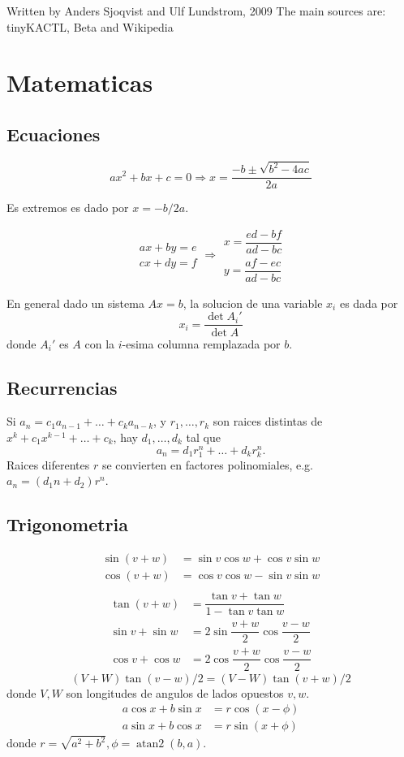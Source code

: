 Written by Anders Sjoqvist and Ulf Lundstrom, 2009
The main sources are: tinyKACTL, Beta and Wikipedia

\chapter{Matematicas}

\section{Ecuaciones}
\[ax^2+bx+c=0 \Rightarrow x = \frac{-b\pm\sqrt{b^2-4ac}}{2a}\]

Es extremos es dado por $x = -b/2a$.

\[\begin{aligned}ax+by=e\\cx+dy=f\end{aligned}
\Rightarrow
\begin{aligned}x=\dfrac{ed-bf}{ad-bc}\\y=\dfrac{af-ec}{ad-bc}\end{aligned}\]

En general dado un sistema $Ax = b$, la solucion de una variable $x_i$ es dada por
\[x_i = \frac{\det A_i'}{\det A} \]
donde $A_i'$ es $A$ con la $i$-esima columna remplazada por $b$.

\section{Recurrencias}
Si $a_n = c_1 a_{n-1} + \dots + c_k a_{n-k}$, y $r_1, \dots, r_k$ son raices distintas de $x^k + c_1 x^{k-1} + \dots + c_k$, hay $d_1, \dots, d_k$ tal que
\[a_n = d_1r_1^n + \dots + d_kr_k^n. \]
Raices diferentes $r$ se convierten en factores polinomiales, e.g. $a_n = (d_1n + d_2)r^n$.

\section{Trigonometria}
\begin{align*}
\sin(v+w)&{}=\sin v\cos w+\cos v\sin w\\
\cos(v+w)&{}=\cos v\cos w-\sin v\sin w\\
\end{align*}
\begin{align*}
\tan(v+w)&{}=\dfrac{\tan v+\tan w}{1-\tan v\tan w}\\
\sin v+\sin w&{}=2\sin\dfrac{v+w}{2}\cos\dfrac{v-w}{2}\\
\cos v+\cos w&{}=2\cos\dfrac{v+w}{2}\cos\dfrac{v-w}{2}
\end{align*}
\[ (V+W)\tan(v-w)/2{}=(V-W)\tan(v+w)/2 \]
donde $V, W$ son longitudes de angulos de lados opuestos $v, w$.
\begin{align*}
	a\cos x+b\sin x&=r\cos(x-\phi)\\
	a\sin x+b\cos x&=r\sin(x+\phi)
\end{align*}
donde $r=\sqrt{a^2+b^2}, \phi=\operatorname{atan2}(b,a)$.

